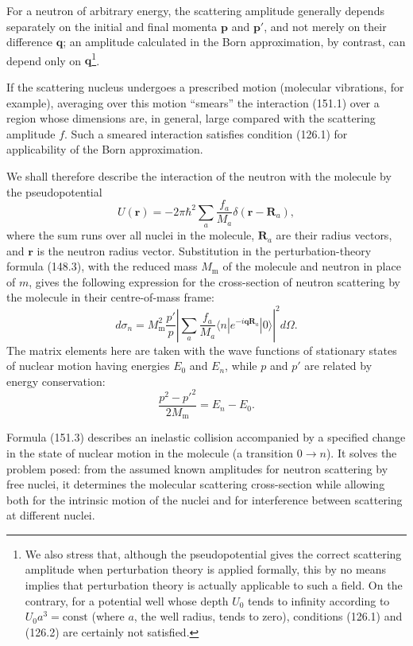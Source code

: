 For a neutron of arbitrary energy, the scattering amplitude generally depends separately on the initial and final momenta $\mathbf p$ and $\mathbf p'$, and not merely on their difference $\mathbf q$; an amplitude calculated in the Born approximation, by contrast, can depend only on $\mathbf q$\footnote{We also stress that, although the pseudopotential gives the correct scattering amplitude when perturbation theory is applied formally, this by no means implies that perturbation theory is actually applicable to such a field. On the contrary, for a potential well whose depth $U_0$ tends to infinity according to $U_0a^3=\mathrm{const}$ (where $a$, the well radius, tends to zero), conditions (126.1) and (126.2) are certainly not satisfied.}.

If the scattering nucleus undergoes a prescribed motion (molecular vibrations, for example), averaging over this motion ``smears'' the interaction (151.1) over a region whose dimensions are, in general, large compared with the scattering amplitude $f$. Such a smeared interaction satisfies condition (126.1) for applicability of the Born approximation.

We shall therefore describe the interaction of the neutron with the molecule by the pseudopotential
\begin{equation}
 U(\mathbf r)=-2\pi\hbar^2\sum_a\frac{f_a}{M_a}\delta(\mathbf r-\mathbf R_a),
 \tag{151.2}
\end{equation}
where the sum runs over all nuclei in the molecule, $\mathbf R_a$ are their radius vectors, and $\mathbf r$ is the neutron radius vector. Substitution in the perturbation-theory formula (148.3), with the reduced mass $M_\text{m}$ of the molecule and neutron in place of $m$, gives the following expression for the cross-section of neutron scattering by the molecule in their centre-of-mass frame:
\begin{equation}
 d\sigma_n=M_\text{m}^2\frac{p'}p
 \left|\sum_a\frac{f_a}{M_a}\langle n|e^{-i\mathbf q\mathbf R_a}|0\rangle\right|^2d\Omega.
 \tag{151.3}
\end{equation}
The matrix elements here are taken with the wave functions of stationary states of nuclear motion having energies $E_0$ and $E_n$, while $p$ and $p'$ are related by energy conservation:
\[
 \frac{p^2-p'^2}{2M_\text{m}}=E_n-E_0.
\]

Formula (151.3) describes an inelastic collision accompanied by a specified change in the state of nuclear motion in the molecule (a transition $0\longrightarrow n$). It solves the problem posed: from the assumed known amplitudes for neutron scattering by free nuclei, it determines the molecular scattering cross-section while allowing both for the intrinsic motion of the nuclei and for interference between scattering at different nuclei.

